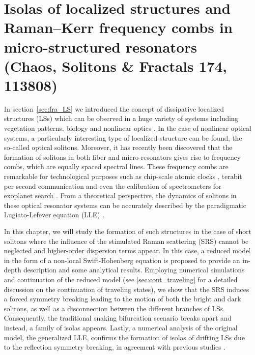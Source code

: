 \chapter{Isolas of localized structures and Raman–Kerr frequency combs in micro-structured resonators (Chaos, Solitons \& Fractals 174, 113808)}

In section~\ref{sec:fra_LS} we introduced the concept of dissipative 
localized structures (LSs) which can be observed in a huge variety
of systems including vegetation patterns, biology and 
nonlinear optics \cite{tlidi2014localized,heimburg2005soliton}. In the case of nonlinear optical systems,
a particularly interesting type of localized structure can be found,
the so-called optical solitons. Moreover, it has recently been discovered that the formation of solitons
in both fiber and micro-resonators gives rise to frequency combs, which are equally
spaced spectral lines. These frequency combs are remarkable
for technological purposes such as chip-scale atomic clocks \cite{Jost2015clock}, terabit
per second communication \cite{marin2017microresonator} and even the calibration of spectrometers
for exoplanet search \cite{suh2019searching}. From a theoretical perspective, the dynamics
of solitons in these optical resonator systems can be accurately described 
by the paradigmatic Lugiato-Lefever equation (LLE) \cite{lugiatolefever1987}.

In this chapter, we will study the formation of such structures in the
case of short solitons where the influence of the stimulated Raman scattering (SRS)
cannot be neglected and higher-order dispersion terms appear. In this case, a reduced model
in the form of a non-local Swift-Hohenberg equation is proposed to provide an
in-depth description and some analytical results. Employing numerical simulations and
continuation of the reduced model (see \ref{sec:cont_traveling} for a detailed discussion on the
continuation of traveling states), we show that the SRS induces a forced symmetry
breaking leading to the motion of both the bright and dark solitons, as well as a disconnection between 
the different branches of LSs. Consequently, the traditional snaking bifurcation scenario breaks
apart and instead, a family of isolas appears. Lastly, a numerical analysis of the
original model, the generalized LLE, confirms the formation of isolas of drifting LSs due
to the reflection symmetry breaking, in agreement with previous studies \cite{burke2009swift,parra2014third}.




